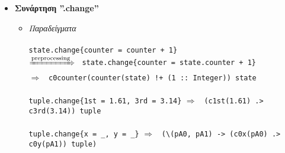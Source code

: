 \documentclass[diploma]{softlab-thesis}
\def\H{Haskell}
\def\lra{$\Longrightarrow$\ }
\def\prarr{$\xRightarrow{\text{preprocessing}}$\ }
\begin{document}
\begin{itemize}
\begin{itemize}
\newpage
\item
\textit{Περιγραφή}\\\\
Οι συναρτήσεις επιθήματος δημιουργούνται αυτόματα από την μετάφραση του
αντίστοιχου ορισμού \verb|tuple_type| ή είναι οι ειδίκες συναρτήσεις επιθήματος
τύπων γινομένων (\verb|_.1st _.2nd| κτλ). Μεταφράζονται σε κανονικές \H\
συναρτήσεις (όπως είναι οι συναρτήσεις προβολής στην \H) με το όρισμά τους
σε παρένθεση. Για τις ειδικές συναρτήσεις τύπων γινομένων προσθέτουμε στην
αρχή ένα 'p' (από το "projection") ώστε να είναι σωστό όνομα στην \H.
\\\\
Οι συναρτήσεις των τύπων γινομένων είναι πολυμορφικές και λειτουργούν σε
πλειάδες οποιουδήποτε μήκους (για τώρα $\leq$ 5). Αυτό το καταφέρνουμε
με τον ορισμό του παρακάτω class (για το p1st και αντίστοιχων classes για
τα υπόλοιπα):
\begin{verbatim}
class IsFirst' a b | b -> a where
  p1st :: b -> a
\end{verbatim}
Και των παρακάτω instances:

\begin{verbatim}
instance IsFirst' a (a, b) where
  p1st = fst

instance IsFirst' a (a, b, c) where
  p1st = \(a, _, _) -> a

instance IsFirst' a (a, b, c, d) where
  p1st = \(a, _, _, _) -> a

...
\end{verbatim}
\end{itemize}

\item
\textbf{Συνάρτηση ”.change”}

\begin{itemize}
\item
\textit{Παραδείγματα}\\\\
\texttt{state.change\{counter = counter + 1\}}\\
\prarr
\texttt{state.change\{counter = state.counter + 1\}}\\
\lra
\verb|c0counter(counter(state) !+ (1 :: Integer)) state|
\\\\
\texttt{tuple.change\{1st = 1.61, 3rd = 3.14\}} \lra
\texttt{(c1st(1.61) .> c3rd(3.14)) tuple}
\\\\
\verb|tuple.change{x = _, y = _}| \lra
\verb|(\(pA0, pA1) -> (c0x(pA0) .> c0y(pA1)) tuple)| \\


\end{itemize}
\end{itemize}
\end{document}
